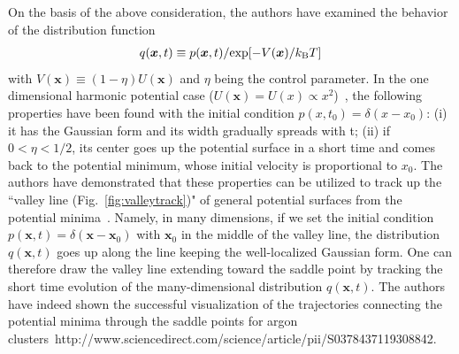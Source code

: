 \documentclass[preprint,12pt]{elsarticle}
\begin{document}
On the basis of the above consideration, the authors have examined the behavior of the distribution function
\begin{eqnarray}
q({\bm x}, t) \equiv p({\bm x}, t)/{\rm exp}[-V({\bm x})/k_{\rm B}T]
\end{eqnarray}
with $V({\bm x})\equiv (1-\eta)U({\bm x})$ and $\eta$ being the control parameter. In the one dimensional harmonic potential case ($U({\bm x})=U(x)\propto x^2$)~\cite{Akashi}, the following properties have been found with the initial condition $p(x, t_{0})=\delta(x-x_{0})$: 
(i) it has the Gaussian form and its width gradually spreads with t; 
(ii) if $0< \eta < 1/2$, its center goes up the potential surface in a short time and comes back to the potential minimum, whose initial velocity is proportional to $x_{0}$. The authors have demonstrated that these properties can be utilized to track up the ``valley line (Fig.~\ref{fig:valleytrack})" of general potential surfaces from the potential minima~\cite{Akashi, Nagornov}. Namely, in many dimensions, if we set the initial condition $p({\bm x}, t)=\delta({\bm x}-{\bm x}_{0})$ with ${\bm x}_{0}$ in the middle of the valley line, the distribution $q({\bm x}, t)$ goes up along the line keeping the well-localized Gaussian form. One can therefore draw the valley line extending toward the saddle point by tracking the short time evolution of the many-dimensional distribution $q({\bm x}, t)$. The authors have indeed shown the successful visualization of the trajectories connecting the potential minima through the saddle points for argon clusters~http://www.sciencedirect.com/science/article/pii/S0378437119308842. 
\end{document}
